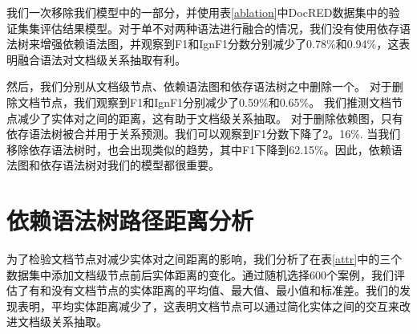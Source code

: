 \documentclass[bachelor]{thesis-uestc}
\begin{document}
我们一次移除我们模型中的一部分，并使用表\ref{ablation}中DocRED数据集中的验证集集评估结果模型。对于单不对两种语法进行融合的情况，我们没有使用依存语法树来增强依赖语法图，并观察到F1和IgnF1分数分别减少了0.78\%和0.94\%，这表明融合语法对文档级关系抽取有利。\par
然后，我们分别从文档级节点、依赖语法图和依存语法树之中删除一个。
对于删除文档节点，我们观察到F1和IgnF1分别减少了0.59\%和0.65\%。
我们推测文档节点减少了实体对之间的距离，这有助于文档级关系抽取。
对于删除依赖图，只有依存语法树被合并用于关系预测。我们可以观察到F1分数下降了2。16\%. 当我们移除依存语法树时，也会出现类似的趋势，其中F1下降到62.15\%。因此，依赖语法图和依存语法树对我们的模型都很重要。\par

\section{依赖语法树路径距离分析}\label{sec:distance}
\begin{table}
    \caption{DocRED、CDR、GDA数据集中具有文档节点和不具有文档节点的实体距离的平均/最大/最小长度和标准差。}
\end{table}\label{attr}

为了检验文档节点对减少实体对之间距离的影响，我们分析了在表\ref{attr}中的三个数据集中添加文档级节点前后实体距离的变化。通过随机选择600个案例，我们评估了有和没有文档节点的实体距离的平均值、最大值、最小值和标准差。我们的发现表明，平均实体距离减少了，这表明文档节点可以通过简化实体之间的交互来改进文档级关系抽取。
\end{document}

